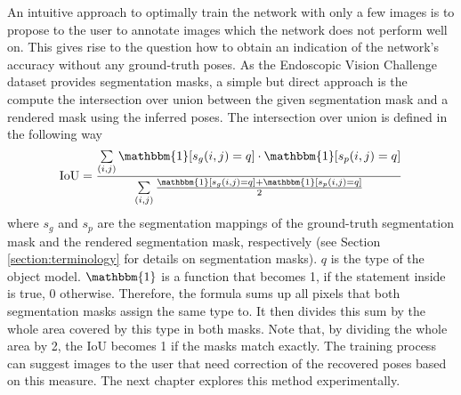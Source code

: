 An intuitive approach to optimally train the network with only a few images is to propose to the user to annotate images which the network does not perform well on. This gives rise to the question how to obtain an indication of the network's accuracy without any ground-truth poses. As the Endoscopic Vision Challenge dataset provides segmentation masks, a simple but direct approach is the compute the intersection over union between the given segmentation mask and a rendered mask using the inferred poses. The intersection over union is defined in the following way
\begin{align*}
\text{IoU} = \frac{\sum\limits_{(i, j)} \mathbbm{1}[s_g(i, j) = q] \cdot  \mathbbm{1}[s_p(i, j) = q]}{\sum\limits_{(i, j)} \frac{\mathbbm{1}[s_g(i, j) = q] +  \mathbbm{1}[s_p(i, j) = q]}{2}}
\end{align*}
where $s_g$ and $s_p$ are the segmentation mappings of the ground-truth segmentation mask and the rendered segmentation mask, respectively (see Section \ref{section:terminology} for details on segmentation masks). $q$ is the type of the object model. $\mathbbm{1}$ is a function that becomes 1, if the statement inside is true, 0 otherwise. Therefore, the formula sums up all pixels that both segmentation masks assign the same type to. It then divides this sum by the whole area covered by this type in both masks. Note that, by dividing the whole area by 2, the $\text{IoU}$ becomes 1 if the masks match exactly. The training process can suggest images to the user that need correction of the recovered poses based on this measure. The next chapter explores this method experimentally.